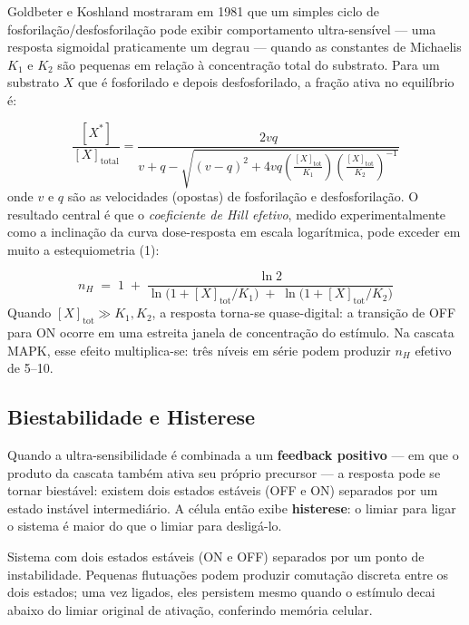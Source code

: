 Goldbeter e Koshland mostraram em 1981 que um simples ciclo de
fosforilação/desfosforilação pode exibir comportamento ultra-sensível ---
uma resposta sigmoidal praticamente um degrau --- quando as constantes de
Michaelis $K_1$ e $K_2$ são pequenas em relação à concentração total do
substrato. Para um substrato $X$ que é fosforilado e depois desfosforilado,
a fração ativa no equilíbrio é:

\begin{equation}
\frac{[X^*]}{[X]_{\mathrm{total}}} = \frac{2 v q}{v + q - \sqrt{(v - q)^2
                              + 4 v q \left(\frac{[X]_{\mathrm{tot}}}{K_1}\right)
                              \left(\frac{[X]_{\mathrm{tot}}}{K_2}\right)^{-1}}}
\end{equation}
onde $v$ e $q$ são as velocidades (opostas) de fosforilação e
desfosforilação. O resultado central é que o \emph{coeficiente de Hill efetivo},
medido experimentalmente como a inclinação da curva dose-resposta em escala
logarítmica, pode exceder em muito a estequiometria (1):

\begin{equation}
n_H \;=\; 1 \;+\; \frac{\ln 2}{\ln\!\bigl(1 + [X]_{\mathrm{tot}}/K_1\bigr)
                              \;+\; \ln\!\bigl(1 + [X]_{\mathrm{tot}}/K_2\bigr)}
\end{equation}
Quando $[X]_{\mathrm{tot}} \gg K_1, K_2$, a resposta torna-se
quase-digital: a transição de OFF para ON ocorre em uma estreita janela de
concentração do estímulo. Na cascata MAPK, esse efeito multiplica-se: três
níveis em série podem produzir $n_H$ efetivo de 5--10.

\subsection{Biestabilidade e Histerese}
\label{subfigure:09-biestabilidade}

Quando a ultra-sensibilidade é combinada a um \textbf{feedback positivo} --- em
que o produto da cascata também ativa seu próprio precursor --- a resposta pode
se tornar biestável: existem dois estados estáveis (OFF e ON) separados por um
estado instável intermediário. A célula então exibe \textbf{histerese}: o
limiar para ligar o sistema é maior do que o limiar para desligá-lo.

\begin{definicaoenv}[Biestabilidade]
Sistema com dois estados estáveis (ON e OFF) separados por um ponto de
instabilidade. Pequenas flutuações podem produzir comutação discreta entre os
dois estados; uma vez ligados, eles persistem mesmo quando o estímulo
decai abaixo do limiar original de ativação, conferindo memória celular.
\end{definicaoenv}

